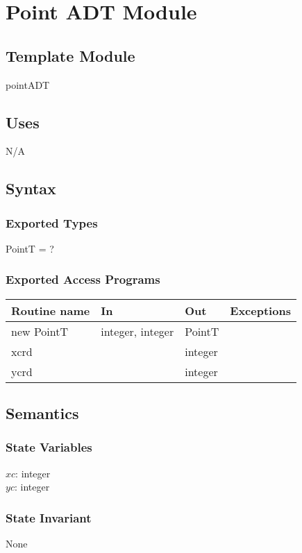 \documentclass[12pt]{article}
\begin{document}
\section* {Point ADT Module}

\subsection*{Template Module}
pointADT

\subsection* {Uses}
N/A

\subsection* {Syntax}

\subsubsection* {Exported Types}
PointT = ?

\subsubsection* {Exported Access Programs}

\begin{tabular}{| l | l | l | l |}
\hline
\textbf{Routine name} & \textbf{In} & \textbf{Out} & \textbf{Exceptions}\\
\hline
new PointT & integer, integer & PointT & ~\\
\hline
xcrd & ~ & integer & ~\\
\hline
ycrd & ~ & integer & ~\\
\hline
\end{tabular}

\subsection* {Semantics}

\subsubsection* {State Variables}
$xc$: integer\\
$yc$: integer

\subsubsection* {State Invariant}
None
\end{document}
